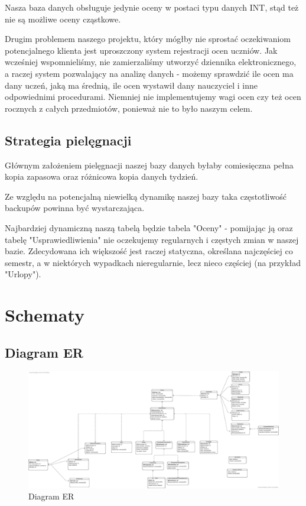 \documentclass[60pt]{article}
\begin{document}
Nasza baza danych obsługuje jedynie oceny w postaci typu danych INT, stąd też nie są możliwe oceny cząstkowe. 

Drugim problemem naszego projektu, który mógłby nie sprostać oczekiwaniom potencjalnego klienta jest uproszczony system rejestracji ocen uczniów. Jak wcześniej wspomnieliśmy, nie zamierzaliśmy utworzyć dziennika elektronicznego, a raczej system pozwalający na analizę danych - możemy sprawdzić ile ocen ma dany uczeń, jaką ma średnią, ile ocen wystawił dany nauczyciel i inne odpowiednimi procedurami. Niemniej nie implementujemy wagi ocen czy też ocen rocznych z całych przedmiotów, ponieważ nie to było naszym celem.

\subsection{Strategia pielęgnacji}

Głównym założeniem pielęgnacji naszej bazy danych byłaby comiesięczna pełna kopia zapasowa oraz różnicowa kopia danych tydzień. 

Ze względu na potencjalną niewielką dynamikę naszej bazy taka częstotliwość backupów powinna być wystarczająca. 

Najbardziej dynamiczną naszą tabelą będzie tabela "Oceny" - pomijając ją oraz tabelę "Usprawiedliwienia" nie oczekujemy regularnych i częstych zmian w naszej bazie. Zdecydowana ich większość jest raczej statyczna, określana najczęściej co semestr, a w niektórych wypadkach nieregularnie, lecz nieco częściej (na przykład "Urlopy").

\newpage
\section{Schematy}

\subsection{Diagram ER}

\begin{figure}[h]
  \includegraphics[width=\linewidth]{diagram_ER.png}
  \caption{Diagram ER}
  \label{Diagram ER}
\end{figure}
\end{document}
